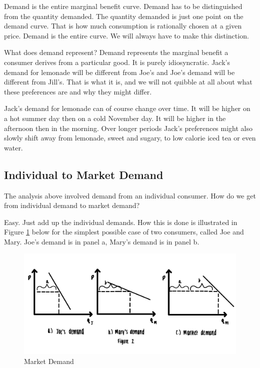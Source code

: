 \documentclass[
]{book}
\begin{document}
Demand is the entire marginal benefit curve. Demand has to be distinguished from the quantity demanded. The quantity demanded is just one point on the demand curve. That is how much consumption is rationally chosen at a given price. Demand is the entire curve. We will always have to make this distinction.

What does demand represent? Demand represents the marginal benefit a consumer derives from a particular good. It is purely idiosyncratic. Jack's demand for lemonade will be different from Joe's and Joe's demand will be different from Jill's. That is what it is, and we will not quibble at all about what these preferences are and why they might differ.

Jack's demand for lemonade can of course change over time. It will be higher on a hot summer day then on a cold November day. It will be higher in the afternoon then in the morning. Over longer periods Jack's preferences might also slowly shift away from lemonade, sweet and sugary, to low calorie iced tea or even water.

\hypertarget{individual-to-market-demand}{%
\subsection{Individual to Market Demand}\label{individual-to-market-demand}}

The analysis above involved demand from an individual consumer. How do we get from individual demand to market demand?

Easy. Just add up the individual demands. How this is done is illustrated in Figure \ref{fig:demand03} below for the simplest possible case of two consumers, called Joe and Mary. Joe's demand is in panel a, Mary's demand is in panel b.

\begin{figure}

{\centering \includegraphics[width=1\linewidth]{img/demand/fig3} 

}

\caption{Market Demand}\label{fig:demand03}
\end{figure}
\end{document}

